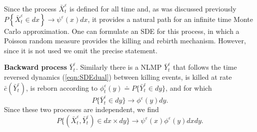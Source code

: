 \documentclass[english,11pt]{article}%
\numberwithin{equation}{section}
\numberwithin{example}{section}
\numberwithin{theorem}{section}
\begin{document}
Since the process $\bar{X}_{t}^{\varepsilon}$ is defined for all time and, as
was discussed previously $P\left\{  \bar{X}_{t}^{\varepsilon}\in dx\right\}
\rightarrow\psi^{\varepsilon}(x)dx$, it provides a natural path for an
infinite time Monte Carlo approximation. One can formulate an SDE for this
process, in which a Poisson random measure provides the killing and rebirth
mechanism. However, since it is not used we omit the precise statement.

\medskip

\textbf{Backward process} $\bar{Y}_{t}^{\varepsilon}$. Similarly there is a
NLMP $\bar{Y}_{t}^{\varepsilon}$ that follows the time reversed dynamics
(\ref{eqn:SDEdual}) between killing events, is killed at rate $\bar{c}(\bar
{Y}_{t}^{\varepsilon})$, is reborn according to $\phi_{t}^{\varepsilon
}(y)\doteq P\{\bar{Y}_{t}^{\varepsilon}\in dy\}$, and for which
\[
P\{\bar{Y}_{t}^{\varepsilon}\in dy\}\rightarrow\phi^{\varepsilon}(y)dy.
\]
Since these two processes are independent, we find
\[
P\{(\bar{X}_{t}^{\varepsilon},\bar{Y}_{t}^{\varepsilon})\in dx\times
dy\}\rightarrow\psi^{\varepsilon}(x)\phi^{\varepsilon}(y)dxdy.
\]
\end{document}
